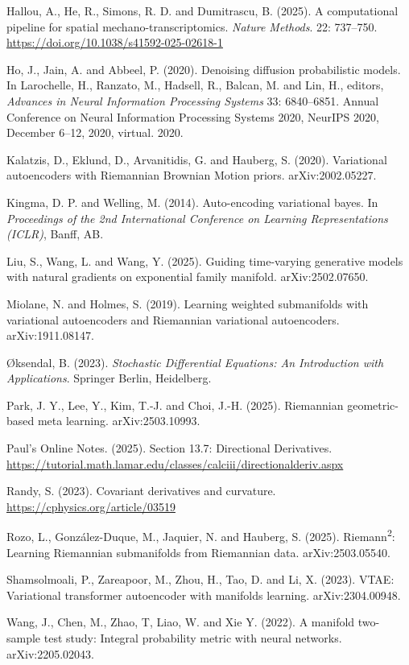 \begin{bookreferences}
  \item Hallou, A., He, R., Simons, R. D. and Dumitrascu, B. (2025). A computational pipeline for spatial mechano-transcriptomics. \emph{Nature Methods}. 22: 737–750. \url{https://doi.org/10.1038/s41592-025-02618-1}
  \item Ho, J., Jain, A. and Abbeel, P. (2020). Denoising diffusion probabilistic models. In Larochelle, H., Ranzato, M., Hadsell, R., Balcan, M. and Lin, H., editors, \emph{Advances in Neural Information Processing Systems} 33: 6840–6851. Annual Conference on Neural Information Processing Systems 2020, NeurIPS 2020, December 6–12, 2020, virtual. 2020.
  \item Kalatzis, D., Eklund, D., Arvanitidis, G. and Hauberg, S. (2020). Variational autoencoders with Riemannian Brownian Motion priors. arXiv:2002.05227.
  \item Kingma, D. P. and Welling, M. (2014). Auto-encoding variational bayes. In \emph{Proceedings of the 2nd International Conference on Learning Representations (ICLR)}, Banff, AB.
  \item Liu, S., Wang, L. and Wang, Y. (2025). Guiding time-varying generative models with natural gradients on exponential family manifold. arXiv:2502.07650.
  \item Miolane, N. and Holmes, S. (2019). Learning weighted submanifolds with variational autoencoders and Riemannian variational autoencoders. arXiv:1911.08147.
  \item Øksendal, B. (2023). \emph{Stochastic Differential Equations: An Introduction with Applications}. Springer Berlin, Heidelberg.
  \item Park, J. Y., Lee, Y., Kim, T.-J. and Choi, J.-H. (2025). Riemannian geometric-based meta learning. arXiv:2503.10993.
  \item Paul's Online Notes. (2025). Section 13.7: Directional Derivatives. \url{https://tutorial.math.lamar.edu/classes/calciii/directionalderiv.aspx}
  \item Randy, S. (2023). Covariant derivatives and curvature. \url{https://cphysics.org/article/03519}
  \item Rozo, L., González-Duque, M., Jaquier, N. and Hauberg, S. (2025). Riemann\textsuperscript{2}: Learning Riemannian submanifolds from Riemannian data. arXiv:2503.05540.
  \item Shamsolmoali, P., Zareapoor, M., Zhou, H., Tao, D. and Li, X. (2023). VTAE: Variational transformer autoencoder with manifolds learning. arXiv:2304.00948.
  \item Wang, J., Chen, M., Zhao, T, Liao, W. and Xie Y. (2022). A manifold two-sample test study: Integral probability metric with neural networks. arXiv:2205.02043.

\end{bookreferences}
